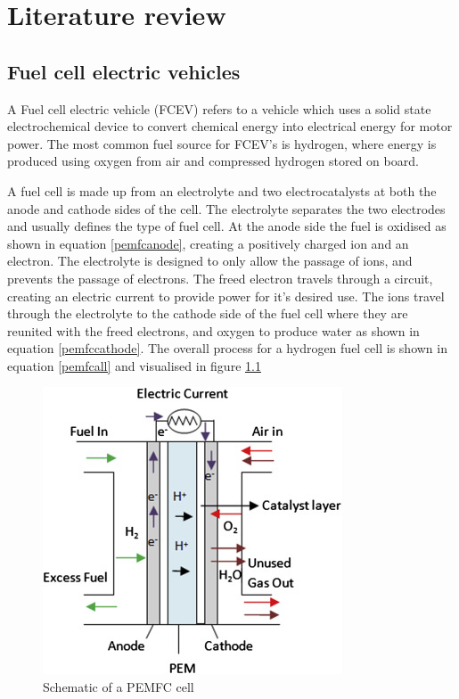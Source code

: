 
\chapter{Literature review}

\section{Fuel cell electric vehicles}
A Fuel cell electric vehicle (FCEV) refers to a vehicle which uses a solid state electrochemical device to convert chemical energy into electrical energy for motor power. The most common fuel source for FCEV's is hydrogen, where energy is produced using oxygen from air and compressed hydrogen stored on board. 

A fuel cell is made up from an electrolyte and two electrocatalysts at both the anode and cathode sides of the cell. The electrolyte separates the two electrodes and usually defines the type of fuel cell. At the anode side the fuel is oxidised as shown in equation \ref{pemfcanode}, creating a positively charged ion and an electron. The electrolyte is designed to only allow the passage of ions, and prevents the passage of electrons. The freed electron travels through a circuit, creating an electric current to provide power for it's desired use. The ions travel through the electrolyte to the cathode side of the fuel cell where they are reunited with the freed electrons, and oxygen to produce water as shown in equation \ref{pemfccathode}. The overall process for a hydrogen fuel cell is shown in equation \ref{pemfcall} and visualised in figure \ref{fig:pemfccell}

\begin{figure}[H]
    \centering
    \includegraphics{figures/pemfccell.jpg}
    \caption{Schematic of a PEMFC cell \cite{Dharmalingam2019}}
    \label{fig:pemfccell}
\end{figure}

